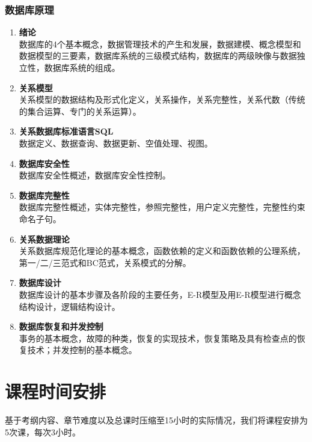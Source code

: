 \documentclass{../note}
\begin{document}
\subsubsection{数据库原理}
\begin{enumerate}
	\item \textbf{绪论}\\
	      数据库的4个基本概念，数据管理技术的产生和发展，数据建模、概念模型和数据模型的三要素，数据库系统的三级模式结构，数据库的两级映像与数据独立性，数据库系统的组成。

	\item \textbf{关系模型}\\
	      关系模型的数据结构及形式化定义，关系操作，关系完整性，关系代数（传统的集合运算、专门的关系运算）。

	\item \textbf{关系数据库标准语言SQL}\\
	      数据定义、数据查询、数据更新、空值处理、视图。

	\item \textbf{数据库安全性}\\
	      数据库安全性概述，数据库安全性控制。

	\item \textbf{数据库完整性}\\
	      数据库完整性概述，实体完整性，参照完整性，用户定义完整性，完整性约束命名子句。

	\item \textbf{关系数据理论}\\
	      关系数据库规范化理论的基本概念，函数依赖的定义和函数依赖的公理系统，第一/二/三范式和BC范式，关系模式的分解。

	\item \textbf{数据库设计}\\
	      数据库设计的基本步骤及各阶段的主要任务，E-R模型及用E-R模型进行概念结构设计，逻辑结构设计。

	\item \textbf{数据库恢复和并发控制}\\
	      事务的基本概念，故障的种类，恢复的实现技术，恢复策略及具有检查点的恢复技术；并发控制的基本概念。
\end{enumerate}

\section{课程时间安排}

基于考纲内容、章节难度以及总课时压缩至15小时的实际情况，我们将课程安排为5次课，每次3小时。
\end{document}
